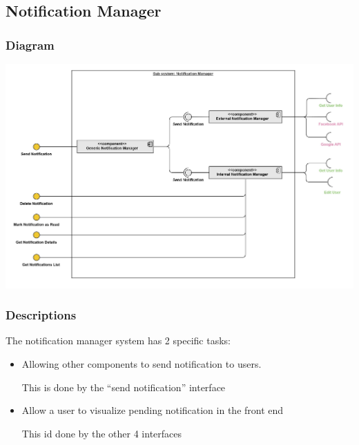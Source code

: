 \documentclass{article}
\begin{document}
\subsection{Notification Manager}
\subsubsection{Diagram}
\includegraphics[width=\textwidth,height=\textheight,keepaspectratio]{images/component_diagram/notification_manager.jpg}
\subsubsection{Descriptions}
The notification manager system has 2 specific tasks:
\begin{itemize}
    \item Allowing other components to send notification to users.

          This is done by the ``send notification'' interface
    \item Allow a user to visualize pending notification in the front end

          This id done by the other 4 interfaces
\end{itemize}
\end{document}
